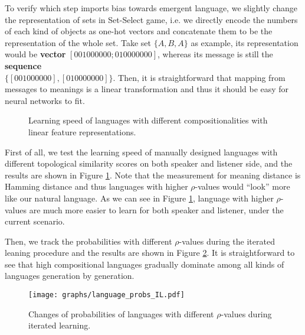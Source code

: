 To verify which step imports bias towards emergent language, we slightly change the representation of sets in Set-Select game, i.e. we directly encode the numbers of each kind of objects as one-hot vectors and concatenate them to be the representation of the whole set. Take set $\{A, B, A\}$ as example, its representation would be \textbf{vector} $[0 0 1 0 0 0 0 0 0; 0 1 0 0 0 0 0 0 0]$, whereas its message is still the \textbf{sequence} \\ $\{[0 0 1 0 0 0 0 0 0], [0 1 0 0 0 0 0 0 0]\}$. Then, it is straightforward that mapping from messages to meanings is a linear transformation and thus it should be easy for neural networks to fit.

\begin{figure}[!h]
    \centering
    \caption{Learning speed of languages with different compositionalities with linear feature representations.}
    \label{fig4.5:learning_speed_joshua}
\end{figure}

First of all, we test the learning speed of manually designed languages with different topological similarity scores on both speaker and listener side, and the results are shown in Figure \ref{fig4.5:learning_speed_joshua}. Note that the measurement for meaning distance is Hamming distance and thus languages with higher $\rho$-values would ``look'' more like our natural language. As we can see in Figure \ref{fig4.5:learning_speed_joshua}, language with higher $\rho$-values are much more easier to learn for both speaker and listener, under the current scenario.

Then, we track the probabilities with different $\rho$-values during the iterated leaning procedure and the results are shown in Figure \ref{fig4.6:lan_prob_IL}. It is straightforward to see that high compositional languages gradually dominate among all kinds of languages generation by generation. 

\begin{figure}[!h]
    \centering
    \texttt{[image: graphs/language\_probs\_IL.pdf]}
    \caption{Changes of probabilities of languages with different $\rho$-values during iterated learning.}
    \label{fig4.6:lan_prob_IL}
\end{figure}

